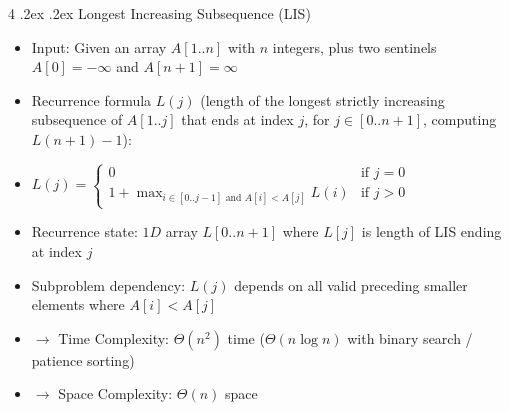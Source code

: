 \documentclass[10pt,landscape,a4paper]{article}
\makeatletter
\renewcommand{\subsection}{\@startsection{subsection}{1}{0mm}%
  {.2ex}%
  {.2ex}%
{\sffamily\bfseries}}
\makeatother
\begin{document}
\begin{multicols*}{4}
  \subsection{Longest Increasing Subsequence (LIS)}
  \begin{itemize}
    \item Input: Given an array $A[1..n]$ with $n$ integers, plus two sentinels $A[0] = -\infty$ and $A[n+1] = \infty$
    \item Recurrence formula $L(j)$ (length of the longest strictly increasing subsequence of $A[1..j]$ that ends at index $j$, for $j \in [0..n+1]$, computing $L(n+1) - 1$):
    \item $L(j) = \begin{cases} 0 & \text{if } j = 0 \\ 1 + \max_{i \in [0..j-1] \text{ and } A[i] < A[j]} L(i) & \text{if } j > 0 \end{cases}$
    \item Recurrence state: $1D$ array $L[0..n+1]$ where $L[j]$ is length of LIS ending at index $j$
    \item Subproblem dependency: $L(j)$ depends on all valid preceding smaller elements where $A[i] < A[j]$
    \item{$\rightarrow$ Time Complexity: $\Theta(n^2)$ time ($\Theta(n \log n)$ with binary search / patience sorting)}
    \item{$\rightarrow$ Space Complexity: $\Theta(n)$ space}
  \end{itemize}


\end{multicols*}
\end{document}
